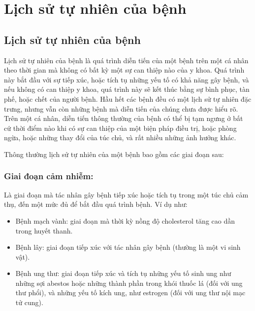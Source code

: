 \documentclass[
]{book}
\providecommand{\tightlist}{%
  \setlength{\itemsep}{0pt}\setlength{\parskip}{0pt}}
\begin{document}
\hypertarget{lux1ecbch-sux1eed-tux1ef1-nhiuxean-cux1ee7a-bux1ec7nh}{%
\section{Lịch sử tự nhiên của bệnh}\label{lux1ecbch-sux1eed-tux1ef1-nhiuxean-cux1ee7a-bux1ec7nh}}

\hypertarget{lux1ecbch-sux1eed-tux1ef1-nhiuxean-cux1ee7a-bux1ec7nh-1}{%
\subsection{Lịch sử tự nhiên của bệnh}\label{lux1ecbch-sux1eed-tux1ef1-nhiuxean-cux1ee7a-bux1ec7nh-1}}

Lịch sử tự nhiên của bệnh là quá trình diễn tiến của một bệnh trên một cá nhân theo thời gian mà không có bất kỳ một sự can thiệp nào của y khoa. Quá trình này bắt đầu với sự tiếp xúc, hoặc tích tụ những yếu tố có khả năng gây bệnh, và nếu không có can thiệp y khoa, quá trình này sẽ kết thúc bằng sự bình phục, tàn phế, hoặc chết của người bệnh. Hầu hết các bệnh đều có một lịch sử tự nhiên đặc trưng, nhưng vẫn còn những bệnh mà diễn tiến của chúng chưa được hiểu rõ. Trên một cá nhân, diễn tiến thông thường của bệnh có thể bị tạm ngưng ở bất cứ thời điểm nào khi có sự can thiệp của một biện pháp điều trị, hoặc phòng ngừa, hoặc những thay đổi của túc chủ, và rất nhiều những ảnh hưởng khác.

Thông thường lịch sử tự nhiên của một bệnh bao gồm các giai đoạn sau:

\hypertarget{giai-ux111oux1ea1n-cux1ea3m-nhiux1ec5m}{%
\subsubsection{Giai đoạn cảm nhiễm:}\label{giai-ux111oux1ea1n-cux1ea3m-nhiux1ec5m}}

Là giai đoạn mà tác nhân gây bệnh tiếp xúc hoặc tích tụ trong một túc chủ cảm thụ, đến một mức đủ để bắt đầu quá trình bệnh. Ví dụ như:

\begin{itemize}
\tightlist
\item
  Bệnh mạch vành: giai đoạn mà thời kỳ nồng độ cholesterol tăng cao dần trong huyết thanh.
\item
  Bệnh lây: giai đoạn tiếp xúc với tác nhân gây bệnh (thường là một vi sinh vật).
\item
  Bệnh ung thư: giai đoạn tiếp xúc và tích tụ những yếu tố sinh ung như những sợi abestos hoặc những thành phần trong khói thuốc lá (đối với ung thư phổi), và những yếu tố kích ung, như estrogen (đối với ung thư nội mạc tử cung).
\end{itemize}
\end{document}
